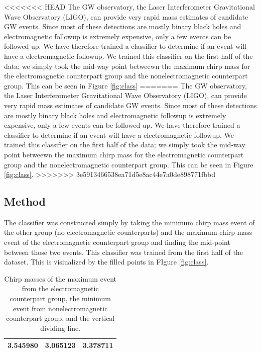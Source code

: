 <<<<<<< HEAD
The GW observatory, the Laser Interferometer Gravitational Wave Observatory (LIGO), can provide very rapid mass estimates of candidate GW events. Since most of these detections are mostly binary black holes and electromagnetic followup is extremely expensive, only a few events can be followed up. We have therefore trained a classifier to determine if an event will have a electromagnetic followup. We trained this classifier on the first half of the data; we simply took the mid-way point betweewn the maximum chirp mass for the electromagnetic counterpart group and the nonelectromagnetic counterpart group. This can be seen in Figure \ref{fig:class}
=======
The GW observatory, the Laser Interferometer Gravitational Wave Observatory (LIGO), can provide very rapid mass estimates of candidate GW events. Since most of these detections are mostly binary black holes and electromagnetic followup is extremely expensive, only a few events can be followed up. We have therefore trained a classifier to determine if an event will have a electromagnetic followup. We trained this classifier on the first half of the data; we simply took the mid-way point betweewn the maximum chirp mass for the electromagnetic counterpart group and the nonelectromagnetic counterpart group. This can be seen in Figure \ref{fig:class}.
>>>>>>> 3e5913466538ea71d5e8ac44e7a0de898771fbbd

\subsection{Method}
The classifier was constructed simply by taking the minimum chirp mass event of the other group (no electromagnetic counterparts) and the maximum chirp mass event of the electromagnetic counterpart group and finding the mid-point between those two events. This classifier was trained from the first half of the dataset. This is visiualized by the filled points in FIgure \ref{fig:class}.

\begin{table}[ht]
\caption{Chirp masses of the maximum event from the electromagnetic counterpart group, the minimum event from nonelectromagnetic counterpart group, and the vertical dividing line.}
\centering
\begin{tabular}{c c c}

\hline\hline
3.545980 & 3.065123 & 3.378711\\
\hline\hline
\end{tabular}
\label{tab:mass}
\end{table}

